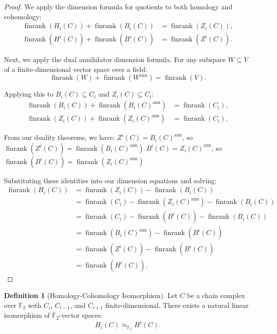 \documentclass[11pt]{article}
\theoremstyle{plain}
\theoremstyle{definition}
\newtheorem*{definition}{Definition}
\theoremstyle{remark}
\begin{document}
\begin{proof}
We apply the dimension formula for quotients to both homology and cohomology:
\begin{align}
\operatorname{finrank}(H_i(C)) + \operatorname{finrank}(B_i(C)) &= \operatorname{finrank}(Z_i(C)), \\
\operatorname{finrank}(H^i(C)) + \operatorname{finrank}(B^i(C)) &= \operatorname{finrank}(Z^i(C)).
\end{align}

Next, we apply the dual annihilator dimension formula. For any subspace $W \subseteq V$ of a finite-dimensional vector space over a field:
\[
\operatorname{finrank}(W) + \operatorname{finrank}(W^{\mathrm{ann}}) = \operatorname{finrank}(V).
\]

Applying this to $B_i(C) \subseteq C_i$ and $Z_i(C) \subseteq C_i$:
\begin{align}
\operatorname{finrank}(B_i(C)) + \operatorname{finrank}(B_i(C)^{\mathrm{ann}}) &= \operatorname{finrank}(C_i), \\
\operatorname{finrank}(Z_i(C)) + \operatorname{finrank}(Z_i(C)^{\mathrm{ann}}) &= \operatorname{finrank}(C_i).
\end{align}

From our duality theorems, we have:
$Z^i(C) = B_i(C)^{\mathrm{ann}}$, so $\operatorname{finrank}(Z^i(C)) = \operatorname{finrank}(B_i(C)^{\mathrm{ann}})$
$B^i(C) = Z_i(C)^{\mathrm{ann}}$, so $\operatorname{finrank}(B^i(C)) = \operatorname{finrank}(Z_i(C)^{\mathrm{ann}})$

Substituting these identities into our dimension equations and solving:
\begin{align}
\operatorname{finrank}(H_i(C)) &= \operatorname{finrank}(Z_i(C)) - \operatorname{finrank}(B_i(C)) \\
&= \operatorname{finrank}(C_i) - \operatorname{finrank}(Z_i(C)^{\mathrm{ann}}) - \operatorname{finrank}(B_i(C)) \\
&= \operatorname{finrank}(C_i) - \operatorname{finrank}(B^i(C)) - \operatorname{finrank}(B_i(C)) \\
&= \operatorname{finrank}(B_i(C)^{\mathrm{ann}}) - \operatorname{finrank}(B^i(C)) \\
&= \operatorname{finrank}(Z^i(C)) - \operatorname{finrank}(B^i(C)) \\
&= \operatorname{finrank}(H^i(C)).
\end{align}
\end{proof}

\begin{definition}[Homology-Cohomology Isomorphism]
Let $C$ be a chain complex over $\mathbb{F}_2$ with $C_i$, $C_{i-1}$, and $C_{i+1}$ finite-dimensional. There exists a natural linear isomorphism of $\mathbb{F}_2$-vector spaces:
\[
  H_i(C) \simeq_{\mathbb{F}_2} H^i(C).
\]
\end{definition}
\end{document}
